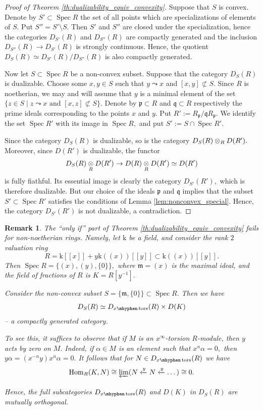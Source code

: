 \documentclass[11pt,leqno]{amsart}
\newtheorem{remark}[theo]{Remark}
\numberwithin{equation}{section}
\def\Hom{\operatorname{Hom}}
\newcommand{\tens}[1]{%
  \mathbin{\mathop{\otimes}\displaylimits_{#1}}%
}
\newcommand{\hy}{\mhyphen}
\newcommand{\prolim}[1][]{\mathop{\varprojlim}\limits_{#1}}
\newcommand{\xlto}{\xleftarrow}
\newcommand{\mk}{\mathrm k}
\newcommand{\Spec}{\operatorname{Spec}}
\newcommand{\tors}{\operatorname{tors}}
\newcommand{\mfp}{\mathfrak{p}}
\newcommand{\mfq}{\mathfrak{q}}
\newcommand{\m}{\mathfrak{m}}
\begin{document}
\begin{proof}[Proof of Theorem \ref{th:dualizability_equiv_convexity}] Suppose that $S$ is convex. Denote by $S'\subset\Spec R$ the set of all points which are specializations of elements of $S.$ Put $S''=S'\setminus S.$ Then $S'$ and $S''$ are closed under the specialization, hence the categories $D_{S'}(R)$ and $D_{S''}(R)$ are compactly generated and the inclusion $D_{S''}(R)\to D_{S'}(R)$ is strongly continuous. Hence, the quotient $D_S(R)\simeq D_{S'}(R)/D_{S''}(R)$ is also compactly generated.

Now let $S\subset \Spec R$ be a non-convex subset. Suppose that the category $D_S(R)$ is dualizable. Choose some $x,y\in S$ such that $y\leadsto x$ and $[x,y]\not\subset S.$ Since $R$ is noetherian, we may and will assume that $y$ is a minimal element of the set $\{z\in S\mid z\leadsto x\text{ and }[x,z]\not\subset S\}.$ Denote by $\mfp\subset R$ and $\mfq\subset R$ respectively the prime ideals corresponding to the points $x$ and $y.$ Put $R':=R_{\mfp}/\mfq R_{\mfp}.$ We identify the set $\Spec R'$ with its image in $\Spec R,$ and put $S':=S\cap \Spec R'.$

Since the category $D_S(R)$ is dualizable, so is the category $D_S(R)\tens{R}D(R').$ Moreover, since $D(R')$ is dualizable, the functor
$$D_S(R)\tens{R}D(R')\to D(R)\tens{R}D(R')\simeq D(R')$$
is fully fiathful. Its essential image is clearly the category $D_{S'}(R'),$ which is therefore dualizable. But our choice of the ideals $\mfp$ and $\mfq$ implies that the subset $S'\subset\Spec R'$ satisfies the conditions of Lemma \ref{lem:nonconvex_special}. Hence, the category $D_{S'}(R')$ is not dualizable, a contradiction.\end{proof}

\begin{remark} The ``only if'' part of Theorem \ref{th:dualizability_equiv_convexity} fails for non-noetherian rings. Namely, let $\mk$ be a field, and consider the rank $2$ valuation ring $$R=\mk[[x]]+y\mk((x))[[y]]\subset \mk((x))[[y]].$$
Then $\Spec R=\{(x),(y),\{0\}\},$ where $\m=(x)$ is the maximal ideal, and the field of fractions of $R$ is $K=R[y^{-1}].$

Consider the non-convex subset $S=\{\m,\{0\}\}\subset\Spec R.$ Then we have $$D_S(R)\simeq D_{x\hy\tors}(R)\times D(K)$$ -- a compactly generated category.

To see this, it suffices to observe that if $M$ is an $x^{\infty}$-torsion $R$-module, then $y$ acts by zero on $M.$ Indeed, if $\alpha\in M$ is an element such that $x^n\alpha=0,$ then $y\alpha=(x^{-n}y)x^n\alpha=0.$ It follows that for $N\in D_{x\hy\tors}(R)$ we have
$$\Hom_R(K,N)\cong\prolim[](N\xlto{y}N\xlto{y}\dots)\cong 0.$$  
Hence, the full subcategories $D_{x\hy\tors}(R)$ and $D(K)$ in $D_S(R)$ are mutually orthogonal.
\end{remark}
\end{document}
